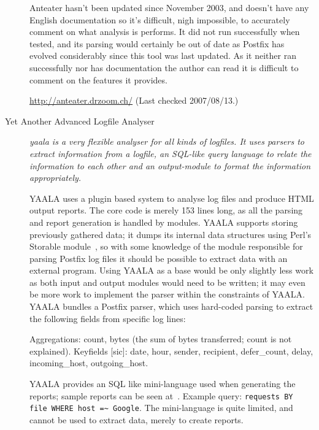 \documentclass[a4paper,12pt,draft]{article}
\begin{document}
\begin{description}
        Anteater hasn't been updated since November 2003, and doesn't have
        any English documentation so it's difficult, nigh impossible, to
        accurately comment on what analysis is performs.  It did not run
        successfully when tested, and its parsing would certainly be out of
        date as Postfix has evolved considerably since this tool was last
        updated.  As it neither ran successfully nor has documentation the
        author can read it is difficult to comment on the features it
        provides.
        
        \url{http://anteater.drzoom.ch/} \newline (Last checked
        2007/08/13.)

    \item [Yet Another Advanced Logfile Analyser] \textit{yaala is a very
        flexible analyser for all kinds of logfiles. It uses parsers to
        extract information from a logfile, an SQL-like query language to
        relate the information to each other and an output-module to format
        the information appropriately.\/}

        YAALA uses a plugin based system to analyse log files and produce
        HTML output reports.  The core code is merely 153 lines long, as
        all the parsing and report generation is handled by modules.  YAALA
        supports storing previously gathered data; it dumps its internal
        data structures using Perl's Storable module~\cite{perl-storable},
        so with some knowledge of the module responsible for parsing
        Postfix log files it should be possible to extract data with an
        external program.  Using YAALA as a base would be only slightly
        less work as both input and output modules would need to be
        written; it may even be more work to implement the parser within
        the constraints of YAALA\@.  YAALA bundles a Postfix parser, which
        uses hard-coded parsing to extract the following fields from
        specific log lines:

        Aggregations: count, bytes (the sum of bytes transferred; count is
        not explained).\newline
        Keyfields [sic]: date, hour, sender, recipient, defer\_count, delay,
        incoming\_host, outgoing\_host.

        YAALA provides an SQL like mini-language used when generating the
        reports; sample reports can be seen at~\cite{yaala-samples}.
        Example query: \newline \hspace*{2em} \texttt{requests BY file
        WHERE host =\~{} Google}. \newline The mini-language is quite
        limited, and cannot be used to extract data, merely to create
        reports.


\end{description}
\end{document}
